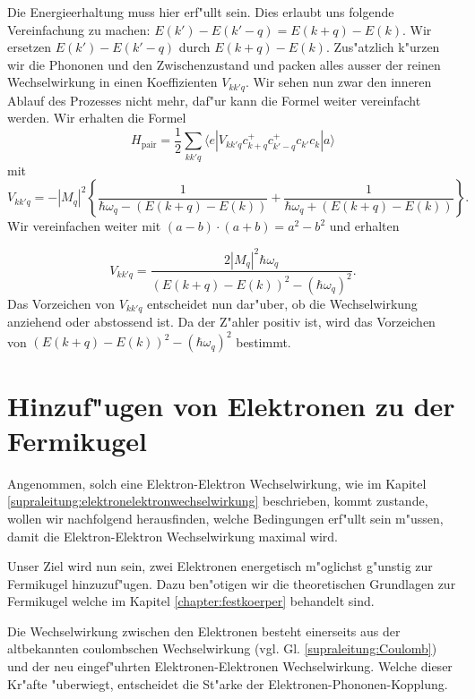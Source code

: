 \begin{refsection}
Die Energieerhaltung muss hier erf"ullt sein. 
Dies erlaubt uns folgende Vereinfachung zu machen:
$E(k')-E(k'-q) = E(k+q)-E(k)$. Wir ersetzen $E(k')-E(k'-q)$ durch $E(k+q)-E(k)$.
Zus"atzlich k"urzen wir die Phononen und den Zwischenzustand und packen
alles ausser der reinen Wechselwirkung in einen Koeffizienten $V_{kk'q}$.
Wir sehen nun zwar den inneren Ablauf des Prozesses nicht mehr, daf"ur kann die Formel
weiter vereinfacht werden.
Wir erhalten die Formel
\begin{equation}
H_{\text{pair}}=
\frac{1}{2}
\sum \limits_{kk'q} 
\langle e|V_{kk'q}c^+_{k+q}c^+_{k'-q}c_{k'}c_k|a \rangle
\label{supraleitung:WechselwirkungKurz}
\end{equation}
mit
\begin{equation}
V_{kk'q} = - |M_q|^2 \left\{
\frac{1}{\hbar\omega_q-(E(k+q)-E(k))}
+
\frac{1}{\hbar\omega_q+(E(k+q)-E(k))}
\right\}
\label{supraleitung:WechselwirkungVkk'q}.
\end{equation}
Wir vereinfachen weiter mit $(a-b)\cdot (a+b) = a^2-b^2$ und erhalten

\begin{equation}
V_{kk'q} =
\frac
{2|M_q|^2\hbar\omega_q}
{(E(k+q)-E(k))^2-(\hbar\omega_q)^2}
\label{supraleitung:Wechselwirkung_Vkk'q_Kurz}.
\end{equation}
Das Vorzeichen von $V_{kk'q}$ entscheidet nun dar"uber, ob die Wechselwirkung
anziehend oder abstossend ist. Da der Z"ahler positiv ist, wird das Vorzeichen von $(E(k+q)-E(k))^2-(\hbar\omega_q)^2$ bestimmt.

\section{Hinzuf"ugen von Elektronen zu der Fermikugel}
Angenommen, solch eine Elektron-Elektron Wechselwirkung, wie im Kapitel
\ref{supraleitung:elektronelektronwechselwirkung} beschrieben, kommt zustande,
wollen wir nachfolgend herausfinden, welche Bedingungen erf"ullt sein m"ussen, damit die
Elektron-Elektron Wechselwirkung maximal wird.

Unser Ziel wird nun sein, zwei Elektronen energetisch m"oglichst g"unstig zur Fermikugel hinzuzuf"ugen.
Dazu ben"otigen wir die theoretischen Grundlagen zur Fermikugel welche im Kapitel
\ref{chapter:festkoerper} behandelt sind.


Die Wechselwirkung zwischen den Elektronen besteht einerseits aus der altbekannten coulombschen
Wechselwirkung (vgl. Gl. \ref{supraleitung:Coulomb}) und der neu eingef"uhrten
Elektronen-Elektronen Wechselwirkung.
Welche dieser Kr"afte "uberwiegt, entscheidet die St"arke der Elektronen-Phononen-Kopplung.


\end{refsection}
